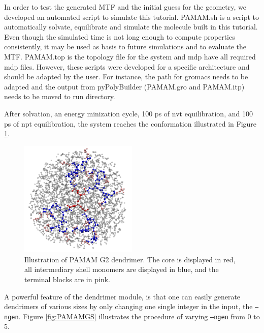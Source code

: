 In order to test the generated MTF and the initial guess for the geometry, we developed an automated script to simulate this tutorial.
PAMAM.sh is a script to automatically solvate, equilibrate and simulate the molecule built in this tutorial.
Even though the simulated time is not long enough to compute properties consistently, it may be used as basis to future simulations and to evaluate the MTF.
PAMAM.top is the topology file for the system and mdp  have all required mdp files.
However, these scripts were developed for a specific architecture and should be adapted by the user.
For instance, the path for gromacs needs to be adapted and the output from pyPolyBuilder (PAMAM.gro and PAMAM.itp) needs to be moved to run directory.

After solvation, an energy minization cycle, 100 ps of nvt equilibration, and 100 ps of npt equilibration, the system reaches the conformation illustrated in Figure \ref{fig:PAMAMG2SOL}.

\begin{figure}[ht!]
    \centering
    \includegraphics[width=0.5\textwidth]{PAMAM/PAMAMSOL.pdf}
    \caption{Illustration of PAMAM G2 dendrimer. The core is displayed in red, all intermediary shell monomers are displayed in blue, and the terminal blocks are in pink.}
    \label{fig:PAMAMG2SOL}
\end{figure}

A powerful feature of the dendrimer module, is that one can easily generate dendrimers of various sizes by only changing one single integer in the input, the \texttt{--ngen}.
Figure \ref{fig:PAMAMGS} illustrates the procedure of varying \texttt{--ngen} from 0 to 5.

